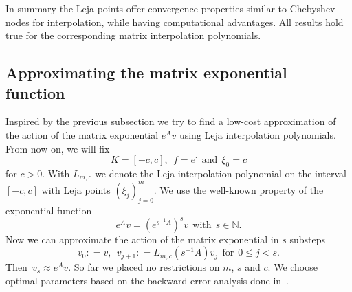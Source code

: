 \documentclass{scrartcl}
\newcommand{\defneq}{\mathrel{\mathop:}=}
\begin{document}
	In summary the Leja points offer convergence properties similar to Chebyshev nodes for interpolation, while having computational advantages. All results hold true for the corresponding matrix interpolation polynomials.
	
\subsection{Approximating the matrix exponential function} \label{sec:ApproxMatrixExponential}
	Inspired by the previous subsection we try to find a low-cost approximation of the action of the matrix exponential $e^Av$ using Leja interpolation polynomials. From now on, we will fix 
	\[K=[-c,c], ~~ f = e^\cdot  ~~\text{and}~~ \xi_0 = c \]
	for $c>0$. With $L_{m,c}$ we denote the Leja interpolation polynomial on the interval $[-c,c]$ with Leja points $(\xi_j)_{j=0}^{m}$. We use the well-known property of the exponential function
	\[e^Av = (e^{s^{-1}A})^sv ~~\text{with}~~ s\in\mathbb{N}.\]
	Now we can approximate the action of the matrix exponential in $s$ substeps
	\[v_0\defneq v, ~~ v_{j+1}\defneq L_{m,c}(s^{-1}A)v_j ~~\text{for}~~ 0\le j<s.\]
	Then~$v_s \approx e^Av$.
	So far we placed no restrictions on $m$, $s$ and $c$. We choose optimal parameters based on the backward error analysis done in~\cite{lejarev}.
	
\end{document}
